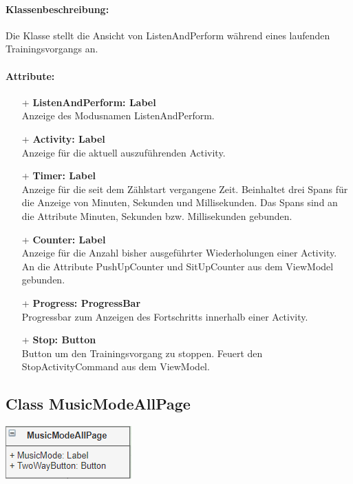 \documentclass[a4paper,12pt]{article}
\begin{document}
\paragraph{Klassenbeschreibung:}
Die Klasse stellt die Ansicht von ListenAndPerform während eines laufenden Trainingsvorgangs an.
\paragraph{Attribute:}
	\begin{itemize}
	\item[+] \textbf{ListenAndPerform: Label} \\ Anzeige des Modusnamen ListenAndPerform.
	\item[+] \textbf{Activity: Label} \\ Anzeige für die aktuell auszuführenden Activity.
	\item[+] \textbf{Timer: Label} \\ Anzeige für die seit dem Zählstart vergangene Zeit. Beinhaltet drei Spans für die Anzeige von Minuten, Sekunden und Millisekunden. Das Spans sind an die Attribute Minuten, Sekunden bzw. Millisekunden gebunden.
	\item[+] \textbf{Counter: Label} \\ Anzeige für die Anzahl bisher ausgeführter Wiederholungen einer Activity. An die Attribute PushUpCounter und SitUpCounter aus dem ViewModel gebunden.
	\item[+] \textbf{Progress: ProgressBar} \\ Progressbar zum Anzeigen des Fortschritts innerhalb einer Activity.
	\item[+] \textbf{Stop: Button} \\ Button um den Trainingsvorgang zu stoppen. Feuert den StopActivityCommand aus dem ViewModel.
	\end{itemize}
	
\begin{minipage}[b]{0.7\textwidth}
	\subsection{Class MusicModeAllPage}
\end{minipage}
\begin{minipage}[c]{0.3\textwidth}
	\includegraphics[width=\textwidth]{bilder/ViewKlassen/MusicModeAllPage.png}
\end{minipage}
\end{document}
